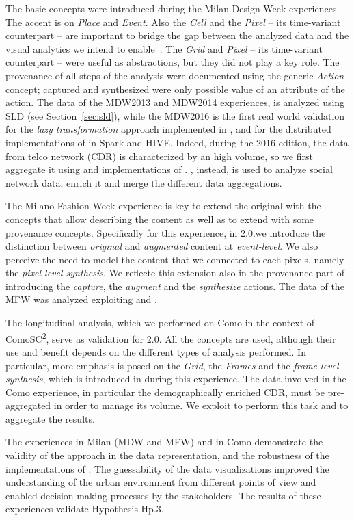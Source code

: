 The basic \frappe{} concepts were introduced during the Milan Design Week experiences. The accent is on \emph{Place} and \emph{Event}. Also the \emph{Cell} and the  \emph{Pixel} -- its time-variant counterpart -- are important to bridge the gap between the analyzed data and the visual analytics we intend to enable~\cite{DBLP:journals/ieeemm/BalduiniVALAC15}. The \emph{Grid} and  \emph{Pixel} -- its time-variant counterpart -- were useful as abstractions, but they did not play a key role. The provenance of all steps of the analysis were documented using the generic \emph{Action} concept; captured and synthesized were only possible value of an attribute of the action. 
The data of the MDW2013 and MDW2014 experiences, is analyzed using SLD (see Section~\ref{sec:sld}), while the MDW2016 is the first real world validation for the \textit{lazy transformation} approach implemented in \sti{}, and for the distributed implementations of \river{} in Spark and HIVE. 
Indeed, during the 2016 edition, the data from telco network (CDR) is characterized by an high volume, so we first aggregate it using \sparkdi{} and \hivedi{} implementations of \river{}. \sti, instead, is used to analyze social network data, enrich it and merge the different data aggregations.

The Milano Fashion Week experience is key to extend the original \frappe{} with the concepts that allow describing the content as well as to extend \frappe{} with some provenance concepts. Specifically for this experience, in \frappe{} 2.0.we introduce the distinction between \emph{original} and \emph{augmented} content at \emph{event-level}. We also perceive the need to model the content that we connected to each pixels, namely the \emph{pixel-level synthesis}. We reflecte this extension also in the provenance part of \frappe{} introducing the \emph{capture}, the \emph{augment} and the \emph{synthesize} actions. The data of the MFW was analyzed exploiting \sti{} and \hivedi{}.

The longitudinal analysis, which we performed on Como in the context of ComoSC\textsuperscript{2}, serve as validation for \frappe{} 2.0. All the concepts are used, although their use and benefit depends on the different types of analysis performed. In particular, more emphasis is posed on the \emph{Grid}, the \emph{Frames} and the \emph{frame-level synthesis}, which is introduced in \frappe{} during this experience. 
The data involved in the Como experience, in particular the demographically enriched CDR, must be pre-aggregated in order to manage its volume. We exploit \sparkdi{} to perform this task and to aggregate the results.

The experiences in Milan (MDW and MFW) and in Como demonstrate the validity of the \frappe{} approach in the data representation, and the robustness of the implementations of \river{}.
The guessability of the data visualizations improved the understanding of the urban environment from different points of view and enabled decision making processes by the stakeholders.
The results of these experiences validate Hypothesis \textsf{Hp.3}.